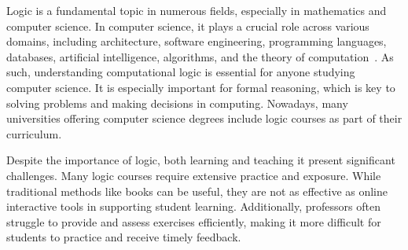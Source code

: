 


Logic is a fundamental topic in numerous fields, especially in mathematics and computer science. In computer science, it plays a crucial role across various domains, including architecture, software engineering, programming languages, databases, artificial intelligence, algorithms, and the theory of computation~\cite{bruce_panel}. As such, understanding computational logic is essential for anyone studying computer science. It is especially important for formal reasoning, which is key to solving problems and making decisions in computing. Nowadays, many universities offering computer science degrees include logic courses as part of their curriculum.

Despite the importance of logic, both learning and teaching it present significant challenges. Many logic courses require extensive practice and exposure. While traditional methods like books can be useful, they are not as effective as online interactive tools in supporting student learning. Additionally, professors often struggle to provide and assess exercises efficiently, making it more difficult for students to practice and receive timely feedback.

